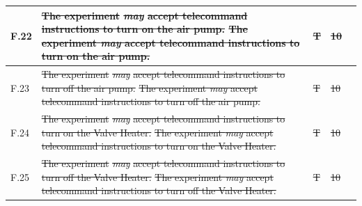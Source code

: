 \documentclass[a4paper,12pt,twoside]{article}
\providecommand{\DIFaddtex}[1]{{\protect\color{blue}\uwave{#1}}} %
\providecommand{\DIFdeltex}[1]{{\protect\color{red}\sout{#1}}}                      %
\providecommand{\DIFaddbegin}{} %
\providecommand{\DIFaddend}{} %
\providecommand{\DIFdelbegin}{} %
\providecommand{\DIFdelend}{} %
\providecommand{\DIFadd}[1]{\texorpdfstring{\DIFaddtex{#1}}{#1}} %
\providecommand{\DIFdel}[1]{\texorpdfstring{\DIFdeltex{#1}}{}} %
\newcommand{\DIFscaledelfig}{0.5}
\newlength{\DIFdelgraphicswidth} %
\newlength{\DIFdelgraphicsheight} %
\newcommand{\DIFaddincludegraphics}[2][]{{\color{blue}\fbox{\DIFOincludegraphics[#1]{#2}}}} %
\newcommand{\DIFdelincludegraphics}[2][]{%
\sbox{\DIFdelgraphicsbox}{\DIFOincludegraphics[#1]{#2}}%
\settoboxwidth{\DIFdelgraphicswidth}{\DIFdelgraphicsbox} %
\settoboxtotalheight{\DIFdelgraphicsheight}{\DIFdelgraphicsbox} %
\scalebox{\DIFscaledelfig}{%
\parbox[b]{\DIFdelgraphicswidth}{\usebox{\DIFdelgraphicsbox}\\[-\baselineskip] \rule{\DIFdelgraphicswidth}{0em}}\llap{\resizebox{\DIFdelgraphicswidth}{\DIFdelgraphicsheight}{%
\setlength{\unitlength}{\DIFdelgraphicswidth}%
\begin{picture}(1,1)%
\thicklines\linethickness{2pt} %
{\color[rgb]{1,0,0}\put(0,0){\framebox(1,1){}}}%
{\color[rgb]{1,0,0}\put(0,0){\line( 1,1){1}}}%
{\color[rgb]{1,0,0}\put(0,1){\line(1,-1){1}}}%
\end{picture}%
}\hspace*{3pt}}} %
} %
\DeclareRobustCommand{\DIFaddbegin}{\DIFOaddbegin \let\includegraphics\DIFaddincludegraphics} %
\DeclareRobustCommand{\DIFaddend}{\DIFOaddend \let\includegraphics\DIFOincludegraphics} %
\DeclareRobustCommand{\DIFdelbegin}{\DIFOdelbegin \let\includegraphics\DIFdelincludegraphics} %
\DeclareRobustCommand{\DIFdelend}{\DIFOaddend \let\includegraphics\DIFOincludegraphics} %
\begin{document}
\begin{longtable}[]{|m{}| m{} |m{} |m{}|m{}|}
F.22 & \DIFdelbegin \DIFdel{The experiment }\textit{\DIFdel{may}} %
\DIFdel{accept telecommand instructions to turn on the air pump.                                                                                             }\DIFdelend \DIFaddbegin \st{The experiment \textit{may} accept telecommand instructions to turn on the air pump.}\DIFadd{\textsuperscript{\ref{fn:unnecessary-requirement}}                                                                                              }\DIFaddend &      \DIFdelbegin \DIFdel{T        }\DIFdelend \DIFaddbegin \DIFadd{-        }\DIFaddend & \DIFdelbegin \DIFdel{10            }\DIFdelend \DIFaddbegin \DIFadd{-            }\DIFaddend &        \\ \hline
F.23 & \DIFdelbegin \DIFdel{The experiment }\textit{\DIFdel{may}} %
\DIFdel{accept telecommand instructions to turn off the air pump.                                                                                            }\DIFdelend \DIFaddbegin \st{The experiment \textit{may} accept telecommand instructions to turn off the air pump.}\DIFadd{\textsuperscript{\ref{fn:unnecessary-requirement}}                                                                                             }\DIFaddend &      \DIFdelbegin \DIFdel{T       }\DIFdelend \DIFaddbegin \DIFadd{-       }\DIFaddend & \DIFdelbegin \DIFdel{10            }\DIFdelend \DIFaddbegin \DIFadd{-            }\DIFaddend &        \\ \hline
F.24 & \DIFdelbegin \DIFdel{The experiment }\textit{\DIFdel{may}} %
\DIFdel{accept telecommand instructions to turn on the Valve Heater.                                                                                         }\DIFdelend \DIFaddbegin \st{The experiment \textit{may} accept telecommand instructions to turn on the Valve Heater.}\DIFadd{\textsuperscript{\ref{fn:unnecessary-requirement}}                                                                                          }\DIFaddend &      \DIFdelbegin \DIFdel{T        }\DIFdelend \DIFaddbegin \DIFadd{-        }\DIFaddend & \DIFdelbegin \DIFdel{10            }\DIFdelend \DIFaddbegin \DIFadd{-            }\DIFaddend &        \\ \hline
F.25 & \DIFdelbegin \DIFdel{The experiment }\textit{\DIFdel{may}} %
\DIFdel{accept telecommand instructions to turn off the Valve Heater.                                                                                        }\DIFdelend \DIFaddbegin \st{The experiment \textit{may} accept telecommand instructions to turn off the Valve Heater.}\DIFadd{\textsuperscript{\ref{fn:unnecessary-requirement}}                                                                                         }\DIFaddend &      \DIFdelbegin \DIFdel{T        }\DIFdelend \DIFaddbegin \DIFadd{-        }\DIFaddend & \DIFdelbegin \DIFdel{10            }\DIFdelend \DIFaddbegin \DIFadd{-            }\DIFaddend &        \\ \hline

\end{longtable}
\end{document}
